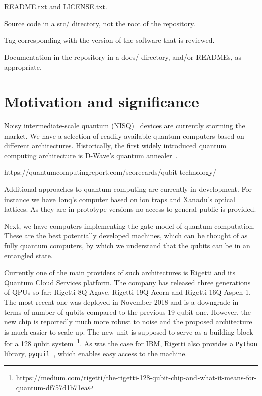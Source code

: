 \documentclass[preprint,12pt, a4paper]{elsarticle}
\newcommand{\1}{{\rm 1\hspace{-0.9mm}l}}
\begin{document}
README.txt and LICENSE.txt.

Source code in a src/ directory, not the root of the repository.

Tag corresponding with the version of the software that is reviewed.

Documentation in the repository in a docs/ directory, and/or READMEs, as appropriate.




\section{Motivation and significance}

Noisy intermediate-scale quantum
(NISQ)~\cite{preskill} devices are currently storming the market. We
have a selection of readily available quantum computers based on different
architectures. Historically, the first widely introduced quantum computing
architecture is D-Wave's quantum annealer~\cite{}. 

https://quantumcomputingreport.com/scorecards/qubit-technology/

Additional approaches to quantum computing are currently in development. For 
instance we have Ionq's computer based on ion traps and Xanadu's optical 
lattices. As they are in prototype versions no access to general public is 
provided. 

Next, we have computers implementing the gate model of quantum computation.
These are the best potentially developed machines, which can be thought
of as fully quantum computers, by which we understand that the qubits can be in
an entangled state. 

Currently one of the main providers of such architectures is Rigetti and its Quantum Cloud Services platform. The company has
released three generations of QPUs so far: Rigetti 8Q Agave, Rigetti 19Q Acorn
and Rigetti 16Q Aspen-1. The most recent one was deployed in November 2018 and
is a downgrade in terms of number of qubits compared to the previous 19 qubit
one. However, the new chip is reportedly much more robust to noise and the
proposed architecture is much easier to scale up. The new unit is supposed to
serve as a building block for a 128 qubit
system~\footnote{https://medium.com/rigetti/the-rigetti-128-qubit-chip-and-what-it-means-for-quantum-df757d1b71ea}.
As was the case for IBM, Rigetti also provides a \texttt{Python} library, 
\texttt{pyquil}~\cite{}, which enables easy access to the machine.

\end{document}
